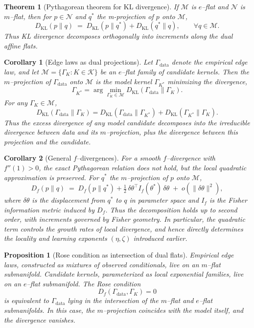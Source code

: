 \documentclass[11pt]{article}
\newtheorem{proposition}{Proposition}
\newtheorem{theorem}{Theorem}
\newtheorem{corollary}{Corollary}
\newcommand{\1}{\mathbf{1}}
\begin{document}
\begin{theorem}[Pythagorean theorem for KL divergence]
If $\mathcal M$ is $e$--flat and $\mathcal N$ is $m$--flat, then for $p\in\mathcal N$ and
$q^\ast$ the m-projection of $p$ onto $\mathcal M$,
\[
D_{\mathrm{KL}}(p\|q) \;=\; D_{\mathrm{KL}}(p\|q^\ast) + D_{\mathrm{KL}}(q^\ast\|q),
\qquad \forall q\in\mathcal M.
\]
Thus KL divergence decomposes orthogonally into increments along the dual affine flats.
\end{theorem}

\begin{corollary}[Edge laws as dual projections]
Let $\Gamma_{\text{data}}$ denote the empirical edge law, and let
$\mathcal M=\{\Gamma_K : K \in \mathcal K\}$ be an $e$--flat family of candidate kernels.
Then the $m$--projection of $\Gamma_{\text{data}}$ onto $\mathcal M$ is the model kernel
$\Gamma_{K^\ast}$ minimizing the divergence,
\[
\Gamma_{K^\ast} = \arg\min_{\Gamma_K \in \mathcal M} D_{\mathrm{KL}}(\Gamma_{\text{data}}\|\Gamma_K).
\]
For any $\Gamma_K \in \mathcal M$,
\[
D_{\mathrm{KL}}(\Gamma_{\text{data}}\|\Gamma_K)
= D_{\mathrm{KL}}(\Gamma_{\text{data}}\|\Gamma_{K^\ast})
+ D_{\mathrm{KL}}(\Gamma_{K^\ast}\|\Gamma_K).
\]
Thus the excess divergence of any model candidate decomposes into the irreducible divergence
between data and its $m$--projection, plus the divergence between this projection and the candidate.
\end{corollary}

\begin{corollary}[General $f$--divergences]
For a smooth $f$--divergence with $f''(1)>0$, the exact Pythagorean relation does not hold,
but the local quadratic approximation is preserved. For $q^\ast$ the $m$--projection of
$p$ onto $\mathcal M$,
\[
D_f(p\|q) \;=\; D_f(p\|q^\ast) + \tfrac{1}{2}\,\delta\theta^\top I_f(\theta^\ast)\,\delta\theta
\;+\; o(\|\delta\theta\|^2),
\]
where $\delta\theta$ is the displacement from $q^\ast$ to $q$ in parameter space and
$I_f$ is the Fisher information metric induced by $D_f$. Thus the decomposition holds
up to second order, with increments governed by Fisher geometry. \emph{In particular, the
quadratic term controls the growth rates of local divergence, and hence directly determines
the locality and learning exponents $(\eta,\zeta)$ introduced earlier.}
\end{corollary}

\begin{proposition}[Rose condition as intersection of dual flats]
Empirical edge laws, constructed as mixtures of observed conditionals, live on an $m$--flat
submanifold. Candidate kernels, parameterized as local exponential families, live on an
$e$--flat submanifold. The Rose condition
\[
D_f(\Gamma_{\text{data}},\Gamma_{K}) = 0
\]
is equivalent to $\Gamma_{\text{data}}$ lying in the intersection of the $m$--flat and
$e$--flat submanifolds. In this case, the $m$--projection coincides with the model itself,
and the divergence vanishes.
\end{proposition}
\end{document}
